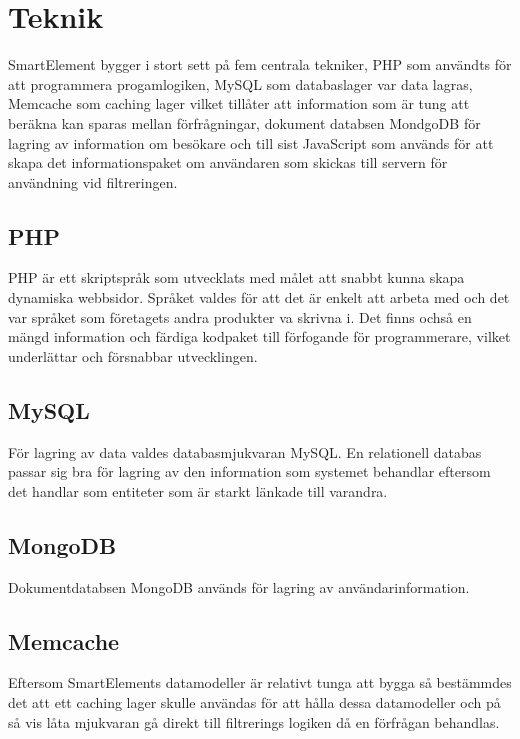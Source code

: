 \section{Teknik}

SmartElement bygger i stort sett på fem centrala tekniker, PHP som användts för att programmera progamlogiken, MySQL som databaslager var data lagras, Memcache som caching lager vilket tillåter att information som är tung att beräkna kan sparas mellan förfrågningar, dokument databsen MondgoDB för lagring av information om besökare och till sist JavaScript som används för att skapa det informationspaket om användaren som skickas till servern för användning vid filtreringen.

\subsection{PHP}

PHP är ett skriptspråk som utvecklats med målet att snabbt kunna skapa dynamiska webbsidor. \citep{phpmanual} Språket valdes för att det är enkelt att arbeta med och det var språket som företagets andra produkter va skrivna i. Det finns ochså en mängd information och färdiga kodpaket till förfogande för programmerare, vilket underlättar och försnabbar utvecklingen.

\subsection{MySQL}

För lagring av data valdes databasmjukvaran MySQL. En relationell databas passar sig bra för lagring av den information som systemet behandlar eftersom det handlar som entiteter som är starkt länkade till varandra.

\subsection{MongoDB}

Dokumentdatabsen MongoDB används för lagring av användarinformation.

\subsection{Memcache}

Eftersom SmartElements datamodeller är relativt tunga att bygga så bestämmdes det att ett caching lager skulle användas för att hålla dessa datamodeller och på så vis låta mjukvaran gå direkt till filtrerings logiken då en förfrågan behandlas.

